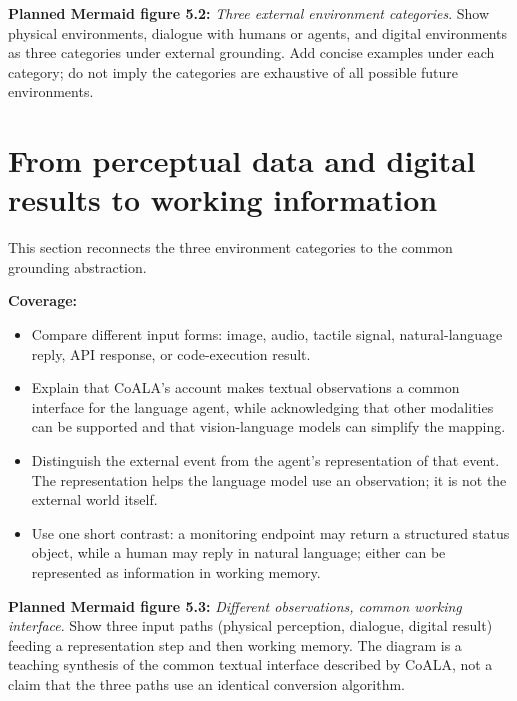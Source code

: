 \textbf{Planned Mermaid figure 5.2:} \emph{Three external environment categories}. Show physical environments, dialogue with humans or agents, and digital environments as three categories under external grounding. Add concise examples under each category; do not imply the categories are exhaustive of all possible future environments. 

\section{From perceptual data and digital results to working information}
This section reconnects the three environment categories to the common grounding abstraction.

\textbf{Coverage:}
\begin{itemize}
  \item Compare different input forms: image, audio, tactile signal, natural-language reply, API response, or code-execution result.
  \item Explain that CoALA's account makes textual observations a common interface for the language agent, while acknowledging that other modalities can be supported and that vision-language models can simplify the mapping.
  \item Distinguish the external event from the agent's representation of that event. The representation helps the language model use an observation; it is not the external world itself.
  \item Use one short contrast: a monitoring endpoint may return a structured status object, while a human may reply in natural language; either can be represented as information in working memory.
\end{itemize}

\textbf{Planned Mermaid figure 5.3:} \emph{Different observations, common working interface}. Show three input paths (physical perception, dialogue, digital result) feeding a representation step and then working memory. The diagram is a teaching synthesis of the common textual interface described by CoALA, not a claim that the three paths use an identical conversion algorithm. 

